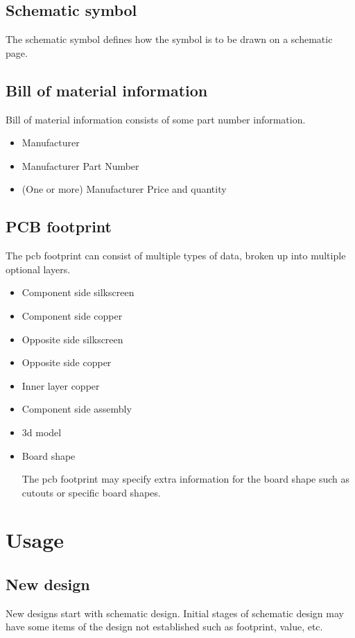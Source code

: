 \documentclass[letterpaper,12pt,twoside]{book}
\begin{document}
\subsection {Schematic symbol}
The schematic symbol defines how the symbol is to be drawn on a schematic page.

\subsection {Bill of material information}
Bill of material information consists of some part number information.
\begin{itemize}
\item Manufacturer
\item Manufacturer Part Number
\item (One or more) Manufacturer Price and quantity
\end{itemize}

\subsection {PCB footprint}
The pcb footprint can consist of multiple types of data, broken up into multiple optional layers.
\begin{itemize}
\item Component side silkscreen
\item Component side copper
\item Opposite side silkscreen
\item Opposite side copper
\item Inner layer copper
\item Component side assembly
\item 3d model
\item Board shape

The pcb footprint may specify extra information for the board shape such as cutouts or specific board shapes.
\end{itemize}

\section {Usage}
\subsection {New design}
New designs start with schematic design. Initial stages of schematic design may have some items of the design not established such as footprint, value, etc.
\end{document}
